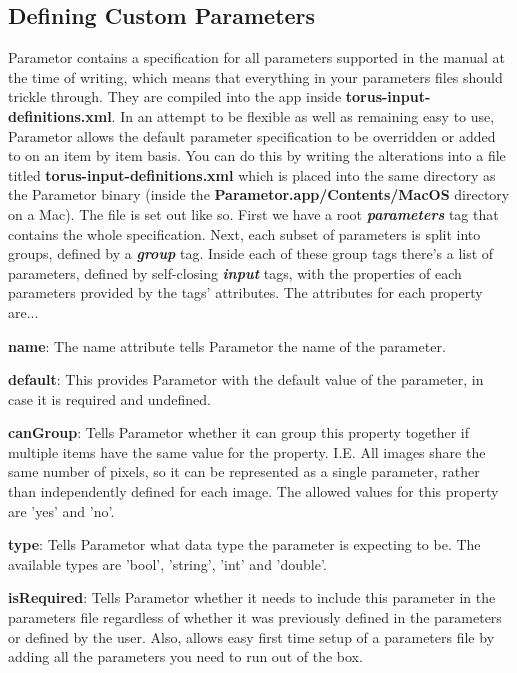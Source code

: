 \documentclass[a4paper,10pt]{article}
\begin{document}
\subsection{Defining Custom Parameters}
Parametor contains a specification for all parameters supported in the manual at the time of writing, which means that everything in your parameters files should trickle through. They are compiled into the app inside \textbf{torus-input-definitions.xml}. In an attempt to be flexible as well as remaining easy to use, Parametor allows the default parameter specification to be overridden or added to on an item by item basis. You can do this by writing the alterations into a file titled \textbf{torus-input-definitions.xml} which is placed into the same directory as the Parametor binary (inside the \textbf{Parametor.app/Contents/MacOS} directory on a Mac). The file is set out like so. First we have a root \textbf{\textit{parameters}} tag that contains the whole specification. Next, each subset of parameters is split into groups, defined by a \textbf{\textit{group}} tag. Inside each of these group tags there's a list of parameters, defined by self-closing \textbf{\textit{input}} tags, with the properties of each parameters provided by the tags' attributes. The attributes for each property are...
\begin{list}{-}
\item \textbf{name}: The name attribute tells Parametor the name of the parameter.
\item \textbf{default}: This provides Parametor with the default value of the parameter, in case it is required and undefined.
\item \textbf{canGroup}: Tells Parametor whether it can group this property together if multiple items have the same value for the property. I.E. All images share the same number of pixels, so it can be represented as a single parameter, rather than independently defined for each image. The allowed values for this property are 'yes' and 'no'.
\item \textbf{type}: Tells Parametor what data type the parameter is expecting to be. The available types are 'bool', 'string', 'int' and 'double'.
\item \textbf{isRequired}: Tells Parametor whether it needs to include this parameter in the parameters file regardless of whether it was previously defined in the parameters or defined by the user. Also, allows easy first time setup of a parameters file by adding all the parameters you need to run out of the box.
\end{list}
\end{document}

